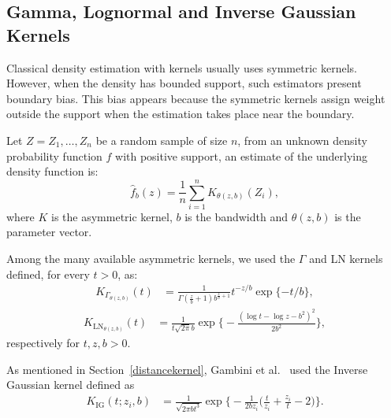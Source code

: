 \documentclass[twocolumn]{svjour3}
\begin{document}
	\subsection{Gamma, Lognormal and Inverse Gaussian Kernels}
	\label{asymmetrickernel}
	
	Classical density estimation with kernels usually uses symmetric kernels. 
	However, when the density has bounded support, such estimators present boundary bias. 
	This bias appears because the symmetric kernels assign weight outside the support when the estimation takes place near the boundary.
	
	
	Let $ Z = Z_1,\dots, Z_n$ be a random sample of size $n$, from an unknown density probability function $f$ with positive support, an estimate of the underlying density function is:
	$$
	\widehat{f}_b(z)=\frac{1}{n}\sum_{i=1}^n K_{\theta(z,b)}(Z_i),
	$$ 
	where $K$ is the asymmetric kernel, $b$ is the bandwidth and ${\theta}(z,b)$ is the parameter vector.
	
	Among the many available asymmetric kernels, we used the $\Gamma$ and LN kernels defined, for every $t>0$, as:
	\begin{align}
		K_{{\Gamma}_{{\theta}(z,b)}}(t) & =\frac{1}{\Gamma(\frac{z}{b}+1)b^{\frac{z}{b}+1}} t^{-{z}/{b}} \exp\{-{t}/{b}\},
		\label{gammakernel}
	\end{align}
	\begin{align}
		K_{{\text{{LN}}}_{{\theta}(z,b)}}(t) & =\frac{1}{t \sqrt{2 \pi} b} \exp\Big\{-\frac{\left(\log t - \log z -b^2\right)^2}{2b^2}\Big\},
		\label{LNkernel}
	\end{align}
	respectively for $t,z,b>0$.
	
	As mentioned in Section~\ref{distancekernel}, Gambini et al.~\cite{gambini2015} used the Inverse Gaussian kernel defined as
	\begin{align}
		K_{\text{IG}}( t; z_i,b) & =\frac{1}{\sqrt{2\pi b t^3}} 
		\exp\Big\{-\frac{1}{2b z_i} \Big(\frac{t}{z_i}+\frac{z_i}{t}-2\Big)\Big\}.
	\end{align}
	
\end{document}
